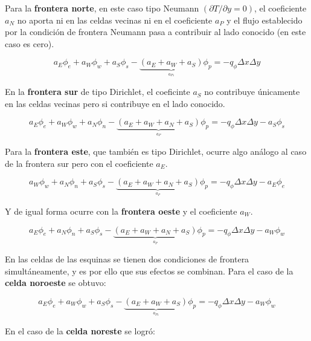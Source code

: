 \documentclass[article,latterpaper]{article}
\begin{document}
Para la \textbf{frontera norte}, en este caso tipo Neumann $(\partial T/\partial y=0)$, el coeficiente $a_N$ no aporta ni en las celdas vecinas ni en el coeficiente $a_P$ y el flujo establecido por la condición de frontera Neumann pasa a contribuir al lado conocido (en este caso es cero).

\begin{equation}
    a_E\phi_e + a_W\phi_w + a_S\phi_s - \underbrace{(a_E+a_W+a_S)}_{\overset{a_{P1}}{}} \phi_p = -q_{\phi} \Delta x \Delta y 
    \label{dis_N}
\end{equation}

En la \textbf{frontera sur} de tipo Dirichlet, el coeficinte $a_S$ no contribuye únicamente en las celdas vecinas pero si contribuye en el lado conocido.

\begin{equation}
    a_E\phi_e + a_W\phi_w + a_N\phi_n - \underbrace{(a_E+a_W+a_N+a_S)}_{\overset{a_{P}}{}} \phi_p = -q_{\phi} \Delta x \Delta y - a_S \phi_s 
    \label{dis_S}
\end{equation}

Para la \textbf{frontera este}, que también es tipo Dirichlet, ocurre algo análogo al caso de la frontera sur pero con el coeficiente $a_E$.

\begin{equation}
    a_W\phi_w + a_N\phi_n + a_S\phi_s - \underbrace{(a_E+a_W+a_N+a_S)}_{\overset{a_{P}}{}} \phi_p = -q_{\phi} \Delta x \Delta y - a_E \phi_e 
    \label{dis_E}
\end{equation}

Y de igual forma ocurre con la \textbf{frontera oeste} y el coeficiente $a_W$.

\begin{equation}
    a_E\phi_e + a_N\phi_n + a_S\phi_s - \underbrace{(a_E+a_W+a_N+a_S)}_{\overset{a_{P}}{}} \phi_p = -q_{\phi} \Delta x \Delta y - a_W\phi_w 
    \label{dis_W}
\end{equation}

En las celdas de las esquinas se tienen dos condiciones de frontera simultáneamente, y es por ello que sus efectos se combinan. Para el caso de la \textbf{celda noroeste} se obtuvo:

\begin{equation}
    a_E\phi_e + a_W\phi_w + a_S\phi_s - \underbrace{(a_E+a_W+a_S)}_{\overset{a_{P1}}{}} \phi_p = -q_{\phi} \Delta x \Delta y - a_W\phi_w
    \label{dis_NW}
\end{equation}

En el caso de la \textbf{celda noreste} se logró:
\end{document}
